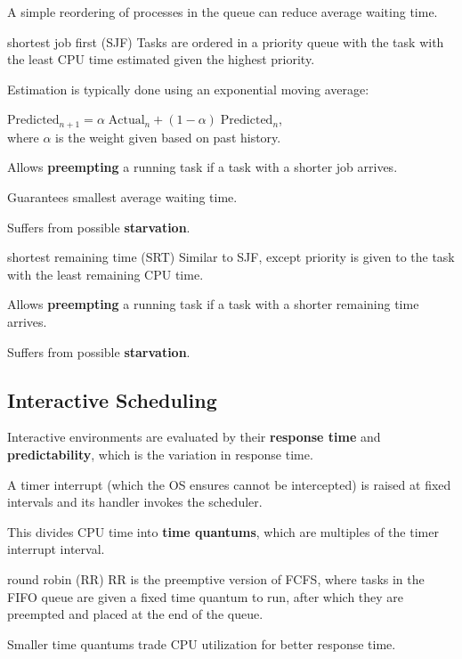 A simple reordering of processes in the queue can reduce average waiting time.

\begin{defn}{shortest job first (SJF)}
    Tasks are ordered in a priority queue with the task with the least CPU time estimated given the highest priority.

    Estimation is typically done using an exponential moving average:

    $\text{Predicted}_{n+1} = \alpha \; \text{Actual}_n + (1 - \alpha) \; \text{Predicted}_n$, \\
    where $\alpha$ is the weight given based on past history.

    Allows \textbf{preempting} a running task if a task with a shorter job arrives.

    Guarantees smallest average waiting time.

    Suffers from possible \textbf{starvation}.
\end{defn}

\begin{defn}{shortest remaining time (SRT)}
    Similar to SJF, except priority is given to the task with the least remaining CPU time.

    Allows \textbf{preempting} a running task if a task with a shorter remaining time arrives.

    Suffers from possible \textbf{starvation}.
\end{defn}

\subsection{Interactive Scheduling}

Interactive environments are evaluated by their \textbf{response time} and \textbf{predictability}, which is the variation in response time.

A timer interrupt (which the OS ensures cannot be intercepted) is raised at fixed intervals and its handler invokes the scheduler.

This divides CPU time into \textbf{time quantums}, which are multiples of the timer interrupt interval.

\begin{defn}{round robin (RR)}
    RR is the preemptive version of FCFS, where tasks in the FIFO queue are given a fixed time quantum to run,
    after which they are preempted and placed at the end of the queue.

    Smaller time quantums trade CPU utilization for better response time.
\end{defn}

